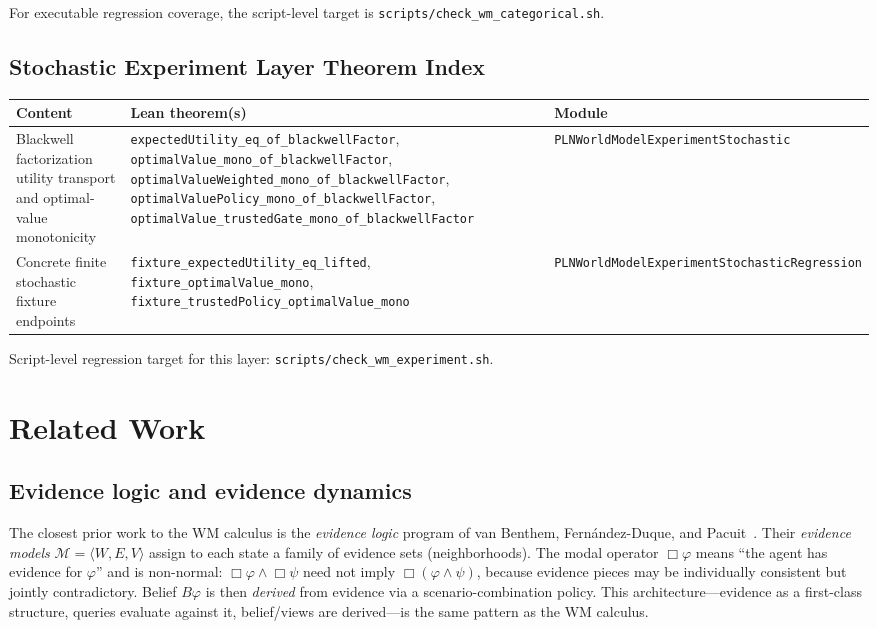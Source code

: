 \documentclass[]{article}
\newcommand{\code}[1]{\texttt{#1}}
\begin{document}
For executable regression coverage, the script-level target is
\code{scripts/check\_wm\_categorical.sh}.

\subsection{Stochastic Experiment Layer Theorem Index}
\label{sec:stochastic-experiment-index}

\begin{longtable}{p{}p{}p{}}
\hline
\textbf{Content} & \textbf{Lean theorem(s)} & \textbf{Module} \\ \hline
\endhead
Blackwell factorization utility transport and optimal-value monotonicity &
\code{expectedUtility\_eq\_of\_blackwellFactor},
\code{optimalValue\_mono\_of\_blackwellFactor},
\code{optimalValueWeighted\_mono\_of\_blackwellFactor},
\code{optimalValuePolicy\_mono\_of\_blackwellFactor},
\code{optimalValue\_trustedGate\_mono\_of\_blackwellFactor} &
\code{PLNWorldModelExperimentStochastic} \\
\hline
Concrete finite stochastic fixture endpoints &
\code{fixture\_expectedUtility\_eq\_lifted},
\code{fixture\_optimalValue\_mono},
\code{fixture\_trustedPolicy\_optimalValue\_mono} &
\code{PLNWorldModelExperimentStochasticRegression} \\
\hline
\end{longtable}

Script-level regression target for this layer:
\code{scripts/check\_wm\_experiment.sh}.


\section{Related Work}
\label{sec:related}

\subsection{Evidence logic and evidence dynamics}

The closest prior work to the WM calculus is the \emph{evidence logic}
program of van Benthem, Fern\'andez-Duque, and
Pacuit~\cite{vanBenthemFernandezDuquePacuit2014,vanBenthemEtAl2013EvidencePlausibility}.
Their \emph{evidence models} $\mathcal{M}=\langle W,E,V\rangle$ assign
to each state a family of evidence sets (neighborhoods). The modal
operator $\Box\varphi$ means ``the agent has evidence for $\varphi$'' and
is non-normal: $\Box\varphi \wedge \Box\psi$ need not imply
$\Box(\varphi\wedge\psi)$, because evidence pieces may be individually
consistent but jointly contradictory. Belief $B\varphi$ is then
\emph{derived} from evidence via a scenario-combination policy. This
architecture---evidence as a first-class structure, queries evaluate
against it, belief/views are derived---is the same pattern as the WM
calculus.
\end{document}
